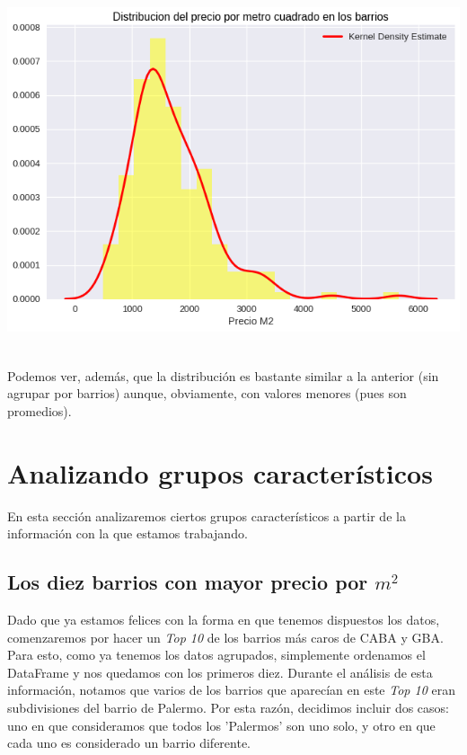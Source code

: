 \documentclass[a4paper, 10pt]{article}
\newcommand\tab[1][0.5cm]{\hspace*{#1}}
\begin{document}
				\begin{center}
   	    				\includegraphics[width=6in, height=4.2in]{images/m2HoodHistogram}
			    \end{center}	
			    \tab Podemos ver, además, que la distribución es bastante similar a la anterior (sin agrupar por barrios) aunque,
			    obviamente, con valores menores (pues son promedios).
		\section{Analizando grupos característicos}
			En esta sección analizaremos ciertos grupos característicos a partir de la información con la que estamos trabajando.
			\subsection{Los diez barrios con mayor precio por $m^2$}
				Dado que ya estamos felices con la forma en que tenemos dispuestos los datos, comenzaremos por hacer un
				\emph{Top 10} de los barrios más caros de CABA y GBA. \\
				\tab Para esto, como ya tenemos los datos agrupados, simplemente ordenamos el DataFrame y nos quedamos con
				los primeros diez.
				\tab Durante el análisis de esta información, notamos que varios de los barrios que aparecían en este \emph{Top 10}
				eran subdivisiones del barrio de Palermo. Por esta razón, decidimos incluir dos casos: uno en que consideramos
				que todos los 'Palermos' son uno solo, y otro en que cada uno es considerado un barrio diferente.
\end{document}
